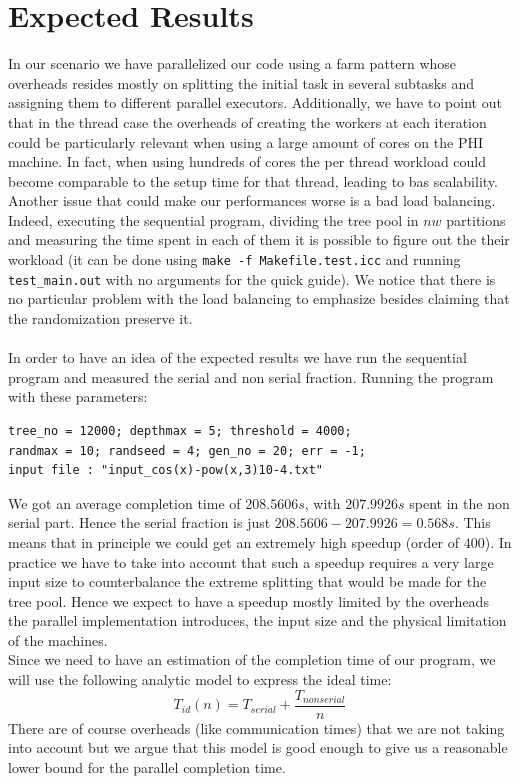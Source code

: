 \documentclass[10pt]{article}
\numberwithin{equation}{section}
\begin{document}
\section{Expected Results}
In our scenario we have parallelized our code using a farm pattern whose overheads resides mostly on splitting the initial task in several subtasks and assigning them to different parallel executors. Additionally, we have to point out that in the thread case the overheads of creating the workers at each iteration could be particularly relevant when using a large amount of cores on the PHI machine. In fact, when using hundreds of cores the per thread workload could become comparable to the setup time for that thread, leading to bas scalability.\\
Another issue that could make our performances worse is a bad load balancing. Indeed, executing the sequential program, dividing the tree pool in $nw$ partitions and measuring the time spent in each of them it is possible to figure out the their workload (it can be done using \verb|make -f Makefile.test.icc| and running \verb|test_main.out| with no arguments for the quick guide). We notice that there is no particular problem with the load balancing to emphasize besides claiming that the randomization preserve it.\\
\\ 
In order to have an idea of the expected results we have run the sequential program and measured the serial and non serial fraction. Running the program with these parameters:
\begin{verbatim}
tree_no = 12000; depthmax = 5; threshold = 4000;
randmax = 10; randseed = 4; gen_no = 20; err = -1;
input file : "input_cos(x)-pow(x,3)10-4.txt"
\end{verbatim} 
We got an average completion time of $208.5606s$, with $207.9926s$ spent in the non serial part. Hence the serial fraction is just $208.5606 - 207.9926 = 0.568s$. This means that in principle we could get an extremely high speedup (order of $400$). In practice we have to take into account that such a speedup requires a very large input size to counterbalance the extreme splitting that would be made for the tree pool. Hence we expect to have a speedup mostly limited by the overheads the parallel implementation introduces, the input size and the physical limitation of the machines.\\
Since we need to have an estimation of the completion time of our program, we will use the following analytic model to express the ideal time:
\begin{equation}
T_{id}(n) = T_{serial} + \frac{T_{nonserial}}{n}
\end{equation}
There are of course overheads (like communication times) that we are not taking into account but we argue that this model is good enough to give us a reasonable lower bound for the parallel completion time.
\end{document}
